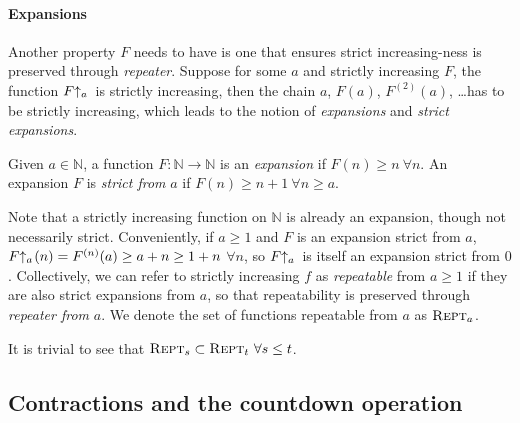 \paragraph{Expansions} Another property $F$ needs to have is one that ensures strict increasing-ness is preserved through \emph{repeater}. Suppose for some $a$ and strictly increasing $F$, the function $\rf{F}{a}\ $ is strictly increasing, then the chain $a$, $F(a)$, $F^{(2)}(a)$, \ldots has to be strictly increasing, which leads to the notion of \emph{expansions} and \emph{strict expansions}.
\begin{defn}
Given $a\in \mathbb{N}$, a function $F:\mathbb{N}\to\mathbb{N}$ is an \emph{expansion} if $F(n)\ge n \ \forall n$. An expansion $F$ is \emph{strict from} $a$ if $F(n)\ge n+1 \ \forall n\ge a$. 
\end{defn}
Note that a strictly increasing function on $\mathbb{N}$ is already an expansion, though not necessarily strict. Conveniently, if $a\ge 1$ and $F$ is an expansion strict from $a$, $\rf{F}{a}(n) = F^{(n)}(a) \ge a + n \ge 1 + n$ $\forall n$, so $\rf{F}{a}\ $ is itself an expansion strict from $0$. Collectively, we can refer to strictly increasing $f$ as \emph{repeatable} from $a\ge 1$ if they are also strict expansions from $a$, so that repeatability is preserved through \emph{repeater from} $a$. We denote the set of functions repeatable from $a$ as $\text{\scshape{Rept}}_a$.
\begin{rem} \label{rem: repeatable-subset}
	It is trivial to see that $\text{\scshape{Rept}}_s \subset \text{\scshape{Rept}}_t \ \forall s\le t $.
\end{rem}

\subsection{Contractions and the countdown operation}

